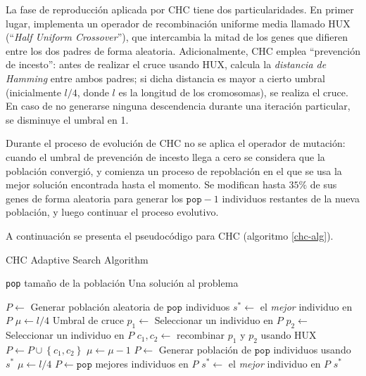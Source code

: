 La fase de reproducción aplicada por CHC tiene dos particularidades. En primer lugar, implementa un operador de recombinación uniforme media llamado HUX (``\emph{Half Uniform Crossover}''), que intercambia la mitad de los genes que difieren entre los dos padres de forma aleatoria. Adicionalmente, CHC emplea ``prevención de incesto'': antes de realizar el cruce usando HUX, calcula la \emph{distancia de Hamming} entre ambos padres; si dicha distancia es mayor a cierto umbral (inicialmente $l/4$, donde $l$ es la longitud de los cromosomas), se realiza el cruce. En caso de no generarse ninguna descendencia durante una iteración particular, se disminuye el umbral en 1.

Durante el proceso de evolución de CHC no se aplica el operador de mutación: cuando el umbral de prevención de incesto llega a cero se considera que la población convergió, y comienza un proceso de repoblación en el que se usa la mejor solución encontrada hasta el momento. Se modifican hasta $35\%$ de sus genes de forma aleatoria para generar los $\texttt{pop}-1$ individuos restantes de la nueva población, y luego continuar el proceso evolutivo.

A continuación se presenta el pseudocódigo para CHC (algoritmo \ref{chc-alg}).

\begin{algorithm}
\caption{CHC Adaptive Search Algorithm}
\label{chc-alg}
\begin{algorithmic}[1]

\Require \texttt{pop} tamaño de la población
\Ensure Una solución al problema

\State $P \gets$ Generar población aleatoria de $\texttt{pop}$ individuos
\State $s^* \gets $ el \emph{mejor} individuo en $P$
\State $\mu \gets l/4$ \Comment Umbral de cruce
		\State $p_1 \gets$ Seleccionar un individuo en $P$
		\State $p_2 \gets$ Seleccionar un individuo en $P$
			\State $c_1, c_2 \gets $ recombinar $p_1$ y $p_2$ usando HUX
			\State $P \gets P \cup \left\lbrace c_1, c_2 \right\rbrace$
		\EndIf
	\EndFor
		\State $\mu \gets \mu-1$
			\State $P \gets$ Generar población de $\texttt{pop}$ individuos usando $s^*$
			\State $\mu \gets l/4$
		\EndIf
	\Else
		\State $P \gets \texttt{pop}$ mejores individuos en $P$
			\State $s^* \gets$ el \emph{mejor} individuo en $P$
		\EndIf
	\EndIf
\EndWhile
\State \Return $s^*$

\end{algorithmic}
\end{algorithm}

